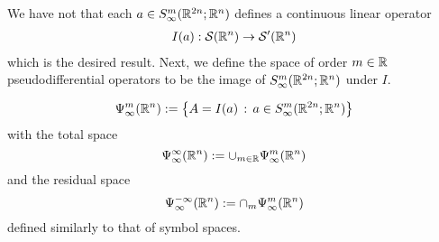 \documentclass[12pt]{article}
\begin{document}
We have not that each $a \in S^{m}_\infty({\mathbb R}^{2n}; {\mathbb R}^n)$ defines a continuous linear operator 
\begin{align*}
I(a) : \mathcal{S}({\mathbb R}^n) \to \mathcal{S}'({\mathbb R}^n)
\end{align*}
which is the desired result. Next, we define the space of order  $m \in {\ensuremath {\mathbb R}}$ pseudodifferential operators to be the image of $S^{m}_{\infty}({\mathbb R}^{2n}; {\mathbb R}^{n})$ under $I$. 

\begin{fdefinition}
    \begin{align*}
    \Psi^{m}_\infty({\mathbb R}^n) := \left\{A = I(a) \, : \, a \in S^{m}_\infty({\mathbb R}^{2n}; {\mathbb R}^n)\right\}
    \end{align*}
    with the total space $$\Psi^{\infty}_\infty({\mathbb R}^n) := \cup_{m \in {\ensuremath {\mathbb R}}} \Psi^m_\infty({\mathbb R}^n)$$ and the residual space $$\Psi^{-\infty}_\infty({\mathbb R}^n) := \cap_m \Psi^m_\infty({\mathbb R}^n)$$ defined similarly to that of symbol spaces. 
\end{fdefinition} 
\end{document}
